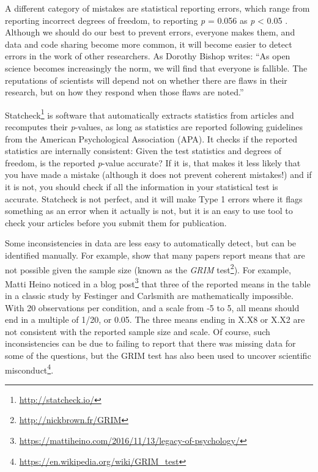 \documentclass[
  oneside]{krantz}
\renewcommand{\href}[2]{#2\footnote{\url{#1}}}
\begin{document}
A different category of mistakes are statistical reporting errors, which range from reporting incorrect degrees of freedom, to reporting \emph{p} = 0.056 as \emph{p} \textless{} 0.05 \citep{nuijten_prevalence_2015}. Although we should do our best to prevent errors, everyone makes them, and data and code sharing become more common, it will become easier to detect errors in the work of other researchers. As Dorothy Bishop \citeyearpar{bishop_fallibility_2018} writes: ``As open science becomes increasingly the norm, we will find that everyone is fallible. The reputations of scientists will depend not on whether there are flaws in their research, but on how they respond when those flaws are noted.''

\href{http://statcheck.io/}{Statcheck} is software that automatically extracts statistics from articles and recomputes their \emph{p}-values, as long as statistics are reported following guidelines from the American Psychological Association (APA). It checks if the reported statistics are internally consistent: Given the test statistics and degrees of freedom, is the reported \emph{p}-value accurate? If it is, that makes it less likely that you have made a mistake (although it does not prevent coherent mistakes!) and if it is not, you should check if all the information in your statistical test is accurate. Statcheck is not perfect, and it will make Type 1 errors where it flags something as an error when it actually is not, but it is an easy to use tool to check your articles before you submit them for publication.

Some inconsistencies in data are less easy to automatically detect, but can be identified manually. For example, \citet{brown_grim_2017} show that many papers report means that are not possible given the sample size (known as the \href{http://nickbrown.fr/GRIM}{\emph{GRIM} test}). For example, Matti Heino noticed in a \href{https://mattiheino.com/2016/11/13/legacy-of-psychology/}{blog post} that three of the reported means in the table in a classic study by Festinger and Carlsmith are mathematically impossible. With 20 observations per condition, and a scale from -5 to 5, all means should end in a multiple of 1/20, or 0.05. The three means ending in X.X8 or X.X2 are not consistent with the reported sample size and scale. Of course, such inconsistencies can be due to failing to report that there was missing data for some of the questions, but the GRIM test has also been used to uncover \href{https://en.wikipedia.org/wiki/GRIM_test}{scientific misconduct}.
\end{document}
